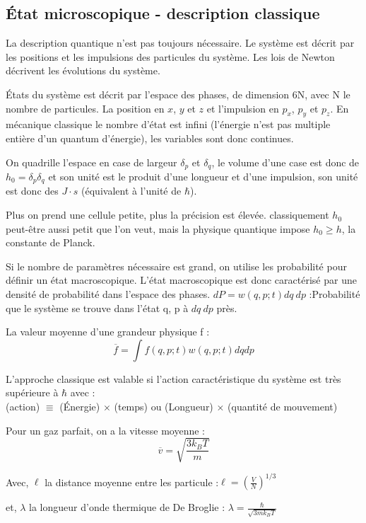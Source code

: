 \documentclass[12pt,a4paper]{report}
\begin{document}
\subsection{État microscopique - description classique}

La description quantique n'est pas toujours nécessaire. Le système est décrit par les positions et les impulsions des particules du système. Les lois de Newton décrivent les évolutions du système.

États du système est décrit par l'espace des phases, de dimension 6N, avec N le nombre de particules. La position en \(x\), \(y\) et \(z\) et l'impulsion en $p_x$, $p_y$ et $p_z$.
En mécanique classique le nombre d'état est infini (l'énergie n'est pas multiple entière d'un quantum d'énergie), les variables sont donc continues.

On quadrille l'espace en case de largeur $\delta_p$ et $\delta_q$, le volume d'une case est donc de \(h_0 = \delta_p \delta_q\) et son unité est le produit d'une longueur et d'une impulsion, son unité est donc des $J\cdot s$ (équivalent à l'unité de \(\hbar\)).

Plus on prend une cellule petite, plus la précision est élevée. classiquement \(h_0\) peut-être aussi petit que l'on veut, mais la physique quantique impose \(h_0 \geq h\), la constante de Planck.

Si le nombre de paramètres nécessaire est grand, on utilise les probabilité pour définir un état macroscopique.
L'état macroscopique est donc caractérisé par une densité de probabilité dans l'espace des phases.
\(dP = w\left( q, p; t\right) dq~dp\) :Probabilité que le système se trouve dans l'état {q, p} à \(dq~dp\) près.

La valeur moyenne d'une grandeur physique f :
\[
	\overline{f} = \int f(q,p; t) w(q,p;t)dq dp
\]

L'approche classique est valable si l'action caractéristique du système est très supérieure à \(\hbar\) avec :\\
(action) \(\equiv\) (Énergie) \(\times\) (temps) ou (Longueur) \(\times\) (quantité de mouvement)

Pour un gaz parfait, on a la vitesse moyenne :
\[
	\overline{v} = \sqrt{\dfrac{3 k_B T}{m}}
\]

Avec, \(\ell\) la distance moyenne entre les particule :\(\ell = \left( \frac{V}{N}\right)^{1/3}\)

et, \(\lambda\) la longueur d'onde thermique de De Broglie : \(\lambda = \frac{\hbar}{\sqrt{3mk_BT}}\)
\end{document}
